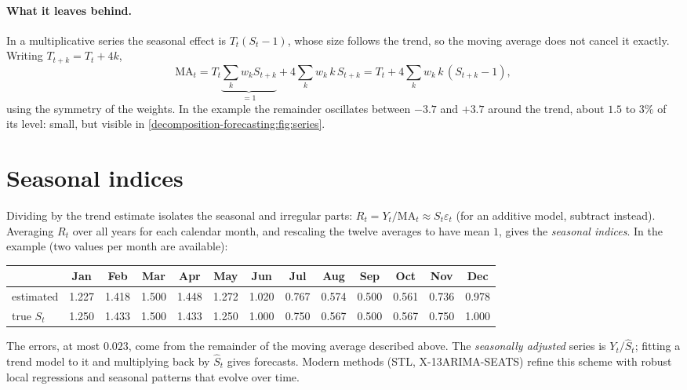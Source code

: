 \begin{notechapter}
\paragraph{What it leaves behind.} In a multiplicative series the seasonal effect is
$T_t(S_t - 1)$, whose size follows the trend, so the moving average does not cancel it
exactly. Writing $T_{t+k} = T_t + 4k$,
\[
  \mathrm{MA}_t = T_t\underbrace{\sum_kw_kS_{t+k}}_{=1} + 4\sum_kw_k\,k\,S_{t+k} = T_t + 4\sum_kw_k\,k\,(S_{t+k} - 1),
\]
using the symmetry of the weights. In the example the remainder oscillates between
$-3.7$ and $+3.7$ around the trend, about $1.5$ to $3\%$ of its level: small, but visible in
\cref{decomposition-forecasting:fig:series}.

\section{Seasonal indices}\label{decomposition-forecasting:sec:indices}

Dividing by the trend estimate isolates the seasonal and irregular parts:
$R_t = Y_t/\mathrm{MA}_t\approx S_t\varepsilon_t$ (for an additive model, subtract instead). Averaging $R_t$ over all years
for each calendar month, and rescaling the twelve averages to have mean $1$, gives the
\emph{seasonal indices}. In the example (two values per month are available):
\begin{center}
\footnotesize\setlength{\tabcolsep}{3pt}
\begin{tabular}{@{}lcccccccccccc@{}}
\toprule
 & Jan & Feb & Mar & Apr & May & Jun & Jul & Aug & Sep & Oct & Nov & Dec \\
\midrule
estimated & 1.227 & 1.418 & 1.500 & 1.448 & 1.272 & 1.020 & 0.767 & 0.574 & 0.500 & 0.561 & 0.736 & 0.978 \\
true $S_t$ & 1.250 & 1.433 & 1.500 & 1.433 & 1.250 & 1.000 & 0.750 & 0.567 & 0.500 & 0.567 & 0.750 & 1.000 \\
\bottomrule
\end{tabular}
\end{center}
The errors, at most $0.023$, come from the remainder of the moving average described
above. The \emph{seasonally adjusted} series is $Y_t/\hat S_t$; fitting a trend model to it and
multiplying back by $\hat S_t$ gives forecasts. Modern methods (STL, X-13ARIMA-SEATS)
refine this scheme with robust local regressions and seasonal patterns that evolve over
time.


\end{notechapter}
